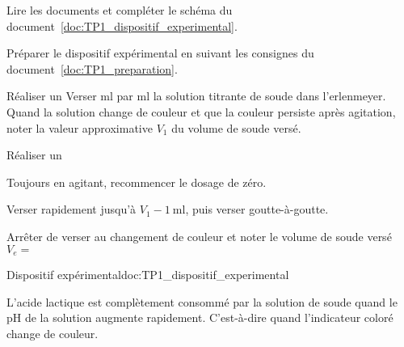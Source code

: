 \numeroQuestion Lire les documents et compléter le schéma du document~\ref{doc:TP1_dispositif_experimental}.

\mesure Préparer le dispositif expérimental en suivant les consignes du document~\ref{doc:TP1_preparation}.

\mesure Réaliser un 
Verser \unit{\ml} par \unit{\ml} la solution titrante de soude dans l'erlenmeyer.
Quand la solution change de couleur et que la couleur persiste après agitation, noter la valeur approximative $V_1$ du volume de soude versé.

\mesure Réaliser un 
\begin{protocole}
  \item Toujours en agitant, recommencer le dosage de zéro.
  \item Verser rapidement jusqu'à $V_1 - \qty{1}{\ml}$, puis verser goutte-à-goutte.
  \item Arrêter de verser au changement de couleur et noter le volume de soude versé $V_e =$ 
\end{protocole}



\begin{doc}{Dispositif expérimental}{doc:TP1_dispositif_experimental}
  \begin{center}
  \end{center}
  
  L'acide lactique est complètement consommé par la solution de soude quand le pH de la solution augmente rapidement.
  C'est-à-dire quand l'indicateur coloré change de couleur.
\end{doc}

